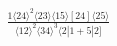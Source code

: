 \documentclass[varwidth, border=5pt]{standalone}
\begin{document}
\begin{my}
$\begin{gathered}
\scriptscriptstyle\frac{1⟨24⟩^2⟨23⟩⟨15⟩[24]⟨25⟩}{⟨12⟩^2⟨34⟩^3⟨2|1+5|2]}
\end{gathered}$
\end{my}
\end{document}
